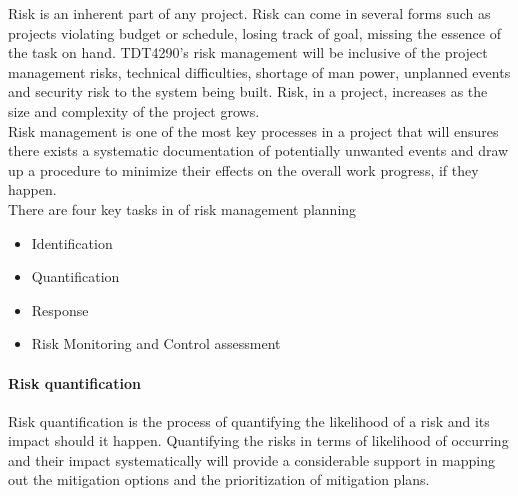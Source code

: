 Risk is an inherent part of any project. Risk can come in several forms such as projects violating budget or schedule, losing track of goal, missing the essence of the task on hand. TDT4290's risk management will be inclusive of the project management risks, technical difficulties, shortage of man power, unplanned events and security risk to the system being built.\cite{wiki:rmf1} Risk, in a project, increases as the size and complexity of the project grows.
\\[0.5cm]
Risk management is one of the most key processes in a project that will ensures there exists a systematic documentation  of potentially unwanted events and draw up a procedure to minimize their effects on the overall work progress, if they happen.
\\[0.5cm]
There are four key tasks in of risk management planning\cite{wiki:rmf2}
\begin{itemize}
    \item{Identification}
	\item{Quantification}
	\item{Response}
    \item{Risk Monitoring and Control assessment}
\end{itemize}

\paragraph{Risk quantification}
Risk quantification is the process of quantifying the likelihood of a risk and its impact should it happen. Quantifying the risks in terms of likelihood of occurring and their impact systematically will provide a considerable support in mapping out the mitigation options and the prioritization of mitigation plans.

